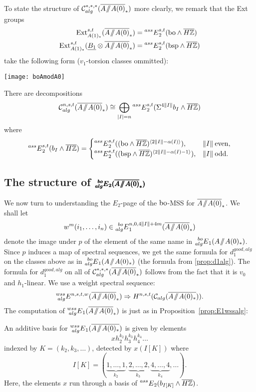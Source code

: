 To state the structure of $\mc{C}_{alg}^{*,*,*}(\AA0)$ more clearly, we remark that the Ext groups
\begin{align*}
\Ext^{s,t}_{A(1)_*}(\AA0) & = \E{ass}{}_2^{s,t}(\bo \wedge \br{H\ZZ}) \\
\Ext^{s,t}_{A(1)_*}(\ull{B_1} \otimes \AA0) & = \E{ass}{}_2^{s,t}(\bsp \wedge \br{H\ZZ})
\end{align*}
take the following form ($v_1$-torsion classes ommitted):
\begin{center}
\texttt{[image: boAmodA0]}
\end{center}

\begin{cor}
There are decompositions
\[ \mc{C}^{n,s,t}_{alg}(\AA0) \cong \bigoplus_{\abs{I} = n} \E{ass}{}^{s,t}_2(\Sigma^{4\norm{I}}b_I \wedge \br{H\ZZ}) \]
where
\[ \prescript{ass}{}{E}^{s,t}_2(b_I \wedge \overline{H\mathbb{Z}}) = 
\begin{cases}
\prescript{ass}{}{E}_2^{s,t}((\mathrm{bo} \wedge \overline{H\mathbb{Z}})^{\langle 2\lVert I \rVert-\alpha(I) \rangle}), & \lVert I \rVert \: \mathrm{even}, \\
\prescript{ass}{}{E}_2^{s,t}((\mathrm{bsp} \wedge \overline{H\mathbb{Z}})^{\langle 2\lVert I \rVert-\alpha(I)-1 \rangle}), & \lVert I \rVert \: \mathrm{odd}.
\end{cases} \]
\end{cor}

\subsection*{The structure of $\pmb{\E{bo}{alg}_2(\AA0)}$}  We now turn to understanding the $E_2$-page of the $\mathrm{bo}$-MSS for $\overline{A\! \sslash \! A(0)}_*$.  We shall let
\[ w^m(i_1, \ldots, i_n) \in \E{bo}{alg}_1^{n, 0, 4\norm{I}+4m}(\AA0) \]
denote the image under $p$ of the element of the same name in $\prescript{bo}{alg}{E}_1(A \! \sslash \! A(0)_*)$.  Since $p$ induces a map of spectral sequences, we get the same formula for $d_1^{good, alg}$ on the classes above as in $\prescript{bo}{alg}{E}_1(A\! \sslash \! A(0)_*)$ (the formula from \ref{prop:d1alg}).
The formula for $d_1^{good,alg}$ on all of $\mathcal{C}_{alg}^{*,*,*}(\overline{A\! \sslash \! A(0)}_*)$ follows from the fact that it is $v_0$ and $h_1$-linear.  We use a weight spectral sequence:
\[ \E{wss}{alg}^{n, s, t, w}(\AA0) \Rightarrow H^{n, s, t}(\mc{C}_{alg}(\br{A \mmod A(0)_*})). \]
The computation of $\E{wss}{alg}_1(\AA0)$ is just as in Proposition~\ref{prop:E1wssalg}:

\begin{prop}\label{prop:E1wssAmodA0}
	An additive basis for $\prescript{wss}{alg}{E}_1(\overline{A \! \sslash \! A(0)_*})$ is given by elements
	$$ x h_2^{k_2} h_3^{k_3}h_4^{k_4} \ldots $$
	indexed by $K = (k_2, k_3, \ldots)$, detected by $x(I[K])$ where 
	$$ I[K] = (\underbrace{1, \ldots ,1}_{k_2}, \underbrace{2, \ldots ,2}_{k_3}, \underbrace{4, \ldots ,4}_{k_4}, \ldots). $$
	Here, the elements $x$ run through a basis of $\prescript{ass}{}{E}_2(b_{I[K]} \wedge \overline{H\mathbb{Z}})$.
\end{prop}

